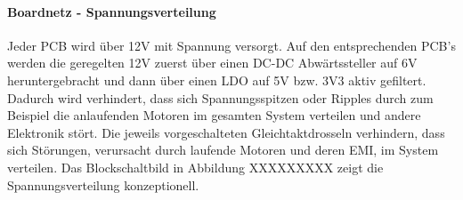 \documentclass[main.tex]{subfiles} %
\begin{document}
\paragraph{Boardnetz - Spannungsverteilung}
Jeder PCB wird über 12V mit Spannung versorgt. Auf den entsprechenden PCB's
werden die geregelten 12V zuerst über einen DC-DC Abwärtssteller auf 6V
heruntergebracht und dann über einen LDO auf 5V bzw. 3V3 aktiv gefiltert.
Dadurch wird verhindert, dass sich Spannungsspitzen oder Ripples durch zum
Beispiel die anlaufenden Motoren im gesamten System verteilen und andere
Elektronik stört. Die jeweils vorgeschalteten Gleichtaktdrosseln verhindern,
dass sich Störungen, verursacht durch laufende Motoren und deren EMI, im System
verteilen. Das Blockschaltbild in Abbildung XXXXXXXXX zeigt die
Spannungsverteilung konzeptionell. %
\end{document}
